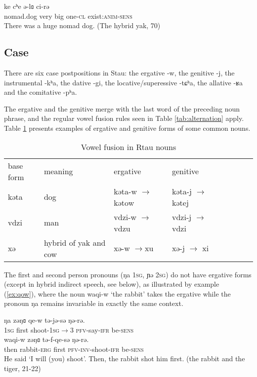 \documentclass[oneside,a4paper,11pt]{article}
\newcommand{\ipa}[1]{{\phon#1}} %
\begin{document}
\begin{exe}
\ex \label{ex:mbrogkhyi}
\gll \ipa{mbroˠcʰə} \ipa{ke} \ipa{cʰe} \ipa{ə-lɞ} \ipa{ci-rə} \\
nomad.dog very big one-\textsc{cl} exist:\textsc{anim}-\textsc{sens}\\
\glt There was a huge nomad dog. (The hybrid yak, 70)
\end{exe}



\subsection{Case} 
There are six case postpositions in Stau: the ergative \ipa{-w}, the genitive \ipa{-j}, the instrumental \ipa{-kʰa}, the dative \ipa{-gi}, the locative/superessive \ipa{-tɕʰa}, the allative \ipa{-ʁa} and the comitative \ipa{-pʰa}.


The ergative and the genitive merge with the last word of the preceding noun phrase, and the regular vowel fusion rules seen in Table \ref{tab:alternation} apply. Table \ref{tab:alternation.noun} presents examples of ergative and genitive forms of some common nouns.

\begin{table}[H]
\caption{Vowel fusion in Rtau nouns} \label{tab:alternation.noun} \centering
\begin{tabular}{l|lllllll}
\toprule
base form & meaning & ergative & genitive \\
\cline{1-4}
\ipa{kəta} & dog & \ipa{kəta-w} $\rightarrow$ \ipa{kətow} & \ipa{kəta-j} $\rightarrow$ \ipa{kətej} & \\
\ipa{vdzi} & man & \ipa{vdzi-w} $\rightarrow$  \ipa{vdzu} & \ipa{vdzi-j} $\rightarrow$ \ipa{vdzi} & \\
\ipa{xə} & hybrid of yak and cow &\ipa{xə-w}  $\rightarrow$\ipa{xu} & \ipa{xə-j} $\rightarrow$ \ipa{xi} & \\
\bottomrule
\end{tabular}
\end{table}

The first and second person pronouns (\ipa{ŋa} \textsc{1sg}, \ipa{ɲə} \textsc{2sg}) do not have ergative forms (except in hybrid indirect speech, see below), as illustrated by example (\ref{ex:qow}), where the noun \ipa{waqi-w}  `the rabbit' takes the ergative while the pronoun \ipa{ŋa} remains invariable in exactly the same context.
 \begin{exe}
\ex \label{ex:qow}
\gll
\ipa{ŋa} 	\ipa{zəŋɞ} 	\ipa{qe-w} \ipa{tə-jə-sə} 	\ipa{ŋə-rə.} \\
\textsc{1sg} first shoot-\textsc{1sg$\rightarrow$3} \textsc{pfv}-say-\textsc{ifr} be-\textsc{sens}\\
\gll \ipa{tɕʰəge,} 	\ipa{waqi-w} 	\ipa{zəŋɞ} 	\ipa{tə-f-qe-sə} 	\ipa{ŋə-rə.} 	\\
then rabbit-\textsc{erg} first \textsc{pfv-inv}-shoot-\textsc{ifr} be-\textsc{sens}\\
\glt He said `I will (you) shoot'. Then, the rabbit shot him first. (the rabbit and the tiger, 21-22)
\end{exe}
\end{document}
